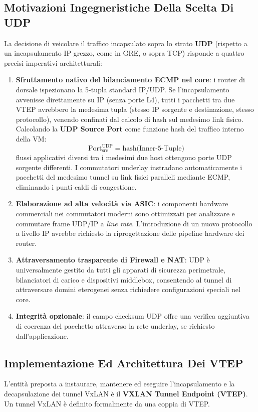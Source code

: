 \documentclass[11pt, a4paper]{article}
\begin{document}
\subsection{Motivazioni Ingegneristiche Della Scelta Di UDP}
La decisione di veicolare il traffico incapsulato sopra lo strato \textbf{UDP} (rispetto a un incapsulamento IP grezzo, come in GRE, o sopra TCP) risponde a quattro precisi imperativi architetturali:
\begin{enumerate}
    \item \textbf{Sfruttamento nativo del bilanciamento ECMP nel core}: i router di dorsale ispezionano la 5-tupla standard IP/UDP. Se l'incapsulamento avvenisse direttamente su IP (senza porte L4), tutti i pacchetti tra due VTEP avrebbero la medesima tupla (stesso IP sorgente e destinazione, stesso protocollo), venendo confinati dal calcolo di hash sul medesimo link fisico.
    Calcolando la \textbf{UDP Source Port} come funzione hash del traffico interno della VM:
    \[
    \text{Port}_{\text{src}}^{\text{UDP}} = \text{hash}\Big(\text{Inner-5-Tuple}\Big)
    \]
    flussi applicativi diversi tra i medesimi due host ottengono porte UDP sorgente differenti. I commutatori underlay instradano automaticamente i pacchetti del medesimo tunnel su link fisici paralleli mediante ECMP, eliminando i punti caldi di congestione.
    \item \textbf{Elaborazione ad alta velocità via ASIC}: i componenti hardware commerciali nei commutatori moderni sono ottimizzati per analizzare e commutare frame UDP/IP a \emph{line rate}. L'introduzione di un nuovo protocollo a livello IP avrebbe richiesto la riprogettazione delle pipeline hardware dei router.
    \item \textbf{Attraversamento trasparente di Firewall e NAT}: UDP è universalmente gestito da tutti gli apparati di sicurezza perimetrale, bilanciatori di carico e dispositivi middlebox, consentendo al tunnel di attraversare domini eterogenei senza richiedere configurazioni speciali nel core.
    \item \textbf{Integrità opzionale}: il campo checksum UDP offre una verifica aggiuntiva di coerenza del pacchetto attraverso la rete underlay, se richiesto dall'applicazione.
\end{enumerate}

\subsection{Implementazione Ed Architettura Dei VTEP}
L'entità preposta a instaurare, mantenere ed eseguire l'incapsulamento e la decapsulazione dei tunnel VxLAN è il \textbf{VXLAN Tunnel Endpoint (VTEP)}. Un tunnel VxLAN è definito formalmente da una coppia di VTEP.
\end{document}
